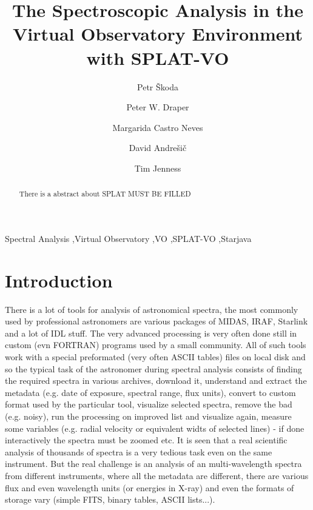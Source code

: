 \documentclass[final,authoryear,5p,times,twocolumn]{elsarticle}
\begin{document}
\begin{frontmatter}

\title{The Spectroscopic Analysis in the Virtual Observatory Environment with SPLAT-VO}

\author[OND]{Petr \v{S}koda}
\author[DUR]{Peter W. Draper}
\author[HDB]{Margarida Castro Neves}
\author[VSB]{David Andre\v{s}i\v{c}}
\author[COR]{Tim Jenness}

\address[OND]{Astronomical Institute of the Academy of Sciences,Fri\v{c}ova~298, 251\,65, Ond\v{r}ejov, Czech Republic}
\address[DUR]{Department of Physics, Institute for Computational
Cosmology, University of Durham, South Road, Durham DH1 3LE, UK}
\address[HDB]{Universit\"a{}t Hyeidelberg, Astronomisches Rechen-Institut,
M\"o{}nchhofstra\ss{}e 12--14, 69120 Heidelberg, Germany}
\address[VSB]{Department of Computer Science, Faculty of Electrical
Engineering and Computer Science, V\v{S}B --- Technical University of Ostrava, 17. listopadu 15, 708 33 Ostrava-Poruba, Czech Republic}
\address[COR]{Department of Astronomy, Cornell University, Ithaca, NY 14853, USA}


\begin{abstract}
There is a abstract about SPLAT
MUST BE FILLED
\end{abstract}
\begin{keyword}
Spectral Analysis \sep Virtual Observatory \sep VO \sep SPLAT-VO \sep Starjava
\end{keyword}
\end{frontmatter}
\section{Introduction}

There is a lot of tools for analysis of astronomical spectra, the most commonly
used by professional astronomers are various packages of MIDAS, IRAF, Starlink and a lot
of IDL stuff. The very advanced processing is very often done still in custom
(evn FORTRAN) programs used by a small community.  All of such tools work with
a special preformated (very often ASCII tables)  files on local disk and so the
typical task of the astronomer during spectral analysis consists of finding the
required spectra in various archives, download it, understand and extract the
metadata (e.g. date of exposure, spectral range, flux units),  convert to
custom format used by the particular tool, visualize selected spectra, remove
the bad (e.g. noisy), run the processing on improved list and visualize again,
measure some variables (e.g. radial velocity or equivalent widts of selected
lines) - if done interactively the spectra must be zoomed etc.  It is seen that
a real scientific analysis of thousands of spectra is a very tedious task even
on the same instrument. But the real challenge is an analysis of an
multi-wavelength spectra from different instruments, where all the metadata are
different, there are various flux and even wavelength units (or energies in
X-ray) and even the formats of storage vary (simple FITS, binary tables, ASCII
lists...).
\end{document}
